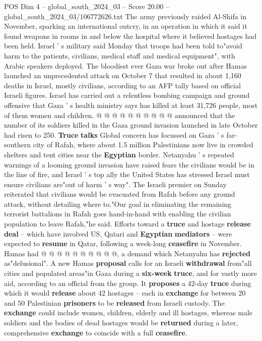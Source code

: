 \begin{textsample}{POS Dim 4 – global\_south\_2024\_03 – Score 20.00 – global\_south\_2024\_03/106772626.txt}
The army previously raided Al-Shifa in November, sparking an international outcry, in an operation in which it said it found weapons in rooms in and below the hospital where it believed hostages had been held.
Israel ' s military said Monday that troops had been told to"avoid harm to the patients, civilians, medical staff and medical equipment", with Arabic speakers deployed.
The bloodiest ever Gaza war broke out after Hamas launched an unprecedented attack on October 7 that resulted in about 1,160 deaths in Israel, mostly civilians, according to an AFP tally based on official Israeli figures.
Israel has carried out a relentless bombing campaign and ground offensive that Gaza ' s health ministry says has killed at least 31,726 people, most of them women and children. @ @ @ @ @ @ @ @ @ @ announced that the number of its soldiers killed in the Gaza ground invasion launched in late October had risen to 250. \textbf{Truce} \textbf{talks} Global concern has focussed on Gaza ' s far-southern city of Rafah, where about 1.5 million Palestinians now live in crowded shelters and tent cities near the \textbf{Egyptian} border.
Netanyahu ' s repeated warnings of a looming ground invasion have raised fears the civilians would be in the line of fire, and Israel ' s top ally the United States has stressed Israel must ensure civilians are"out of harm ' s way".
The Israeli premier on Sunday reiterated that civilians would be evacuated from Rafah before any ground attack, without detailing where to."Our goal in eliminating the remaining terrorist battalions in Rafah goes hand-in-hand with enabling the civilian population to leave Rafah,"he said.
Efforts toward a \textbf{truce} and hostage \textbf{release} \textbf{deal} -- which have involved US, Qatari and \textbf{Egyptian} \textbf{mediators} -- were expected to \textbf{resume} in Qatar, following a week-long \textbf{ceasefire} in November.
Hamas had @ @ @ @ @ @ @ @ @ @, a demand which Netanyahu has \textbf{rejected} as"delusional".
A new Hamas \textbf{proposal} calls for an Israeli \textbf{withdrawal} from"all cities and populated areas"in Gaza during a \textbf{six-week} \textbf{truce}, and for vastly more aid, according to an official from the group.
It \textbf{proposes} a 42-day \textbf{truce} during which it would \textbf{release} about 42 hostages -- each in \textbf{exchange} for between 20 and 50 Palestinian \textbf{prisoners} to be \textbf{released} from Israeli custody.
The \textbf{exchange} could include women, children, elderly and ill hostages, whereas male soldiers and the bodies of dead hostages would be \textbf{returned} during a later, comprehensive \textbf{exchange} to coincide with a full \textbf{ceasefire}.

\end{textsample}
